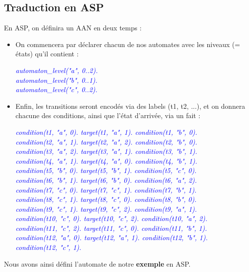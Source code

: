 \documentclass[12pt,a4paper]{article}
\begin{document}
\subsection{Traduction en ASP}
En ASP, on définira un AAN en deux temps :
\begin{itemize}
	\item On commencera par déclarer chacun de nos automates avec les niveaux (= états) qu'il contient :
	\begin {center}
	\emph{
		\textcolor{blue}{
		automaton\_level("a", 0..2).\\
		automaton\_level("b", 0..1).\\
		automaton\_level("c", 0..2).\\
		}
	}
	\end{center}
	\item Enfin, les transitions seront encodés via des labels (t1, t2, ...), et on donnera chacune des conditions, ainsi que l'état d'arrivée, via un fait :
	\begin {center}
	\emph{
		\textcolor{blue}{
		condition(t1, "a", 0). target(t1, "a", 1). condition(t1, "b", 0).\\
		condition(t2, "a", 1). target(t2, "a", 2). condition(t2, "b", 0).\\
		condition(t3, "a", 2). target(t3, "a", 1). condition(t3, "b", 1).\\
		condition(t4, "a", 1). target(t4, "a", 0). condition(t4, "b", 1).\\
		condition(t5, "b", 0). target(t5, "b", 1). condition(t5, "c", 0).\\
		condition(t6, "b", 1). target(t6, "b", 0). condition(t6, "a", 2).\\
		condition(t7, "c", 0). target(t7, "c", 1). condition(t7, "b", 1).\\
		condition(t8, "c", 1). target(t8, "c", 0). condition(t8, "b", 0).\\
		condition(t9, "c", 1). target(t9, "c", 2). condition(t9, "a", 1).\\
		condition(t10, "c", 0). target(t10, "c", 2). condition(t10, "a", 2).\\
		condition(t11, "c", 2). target(t11, "c", 0). condition(t11, "b", 1).\\
		condition(t12, "a", 0). target(t12, "a", 1). condition(t12, "b", 1). condition(t12, "c", 1).\\
		}
	}
	\end{center}
\end{itemize}
Nous avons ainsi défini l'automate de notre \textbf{exemple} en ASP.
\end{document}
